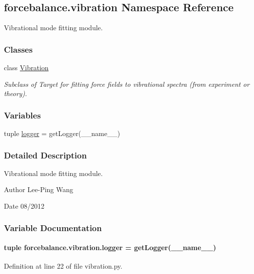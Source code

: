 \hypertarget{namespaceforcebalance_1_1vibration}{\subsection{forcebalance.\-vibration Namespace Reference}
\label{namespaceforcebalance_1_1vibration}
}


Vibrational mode fitting module.  


\subsubsection*{Classes}
\begin{DoxyCompactItemize}
\item 
class \hyperlink{classforcebalance_1_1vibration_1_1Vibration}{Vibration}
\begin{DoxyCompactList}\small\item\em Subclass of Target for fitting force fields to vibrational spectra (from experiment or theory). \end{DoxyCompactList}\end{DoxyCompactItemize}
\subsubsection*{Variables}
\begin{DoxyCompactItemize}
\item 
tuple \hyperlink{namespaceforcebalance_1_1vibration_a1aaf46e8f2b2c8eedf65477360094c0b}{logger} = get\-Logger(\-\_\-\-\_\-name\-\_\-\-\_\-)
\end{DoxyCompactItemize}


\subsubsection{Detailed Description}
Vibrational mode fitting module. \begin{DoxyAuthor}{Author}
Lee-\/\-Ping Wang 
\end{DoxyAuthor}
\begin{DoxyDate}{Date}
08/2012 
\end{DoxyDate}


\subsubsection{Variable Documentation}
\hypertarget{namespaceforcebalance_1_1vibration_a1aaf46e8f2b2c8eedf65477360094c0b}{
\paragraph[{logger}]{\setlength{\rightskip}{0pt plus 5cm}tuple forcebalance.\-vibration.\-logger = get\-Logger(\-\_\-\-\_\-name\-\_\-\-\_\-)}}\label{namespaceforcebalance_1_1vibration_a1aaf46e8f2b2c8eedf65477360094c0b}


Definition at line 22 of file vibration.\-py.

